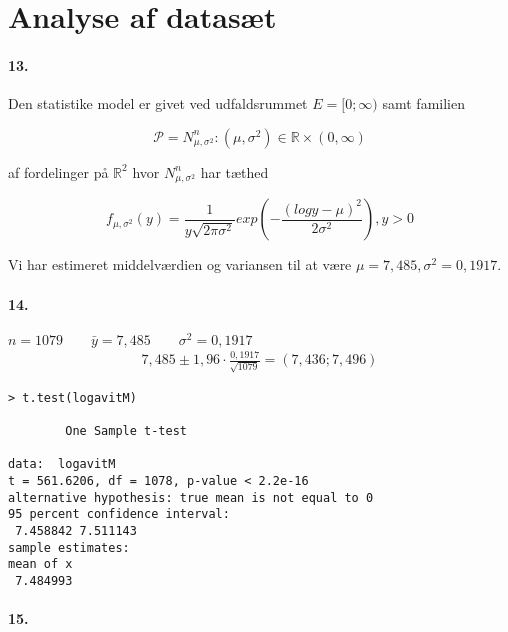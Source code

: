 \section{Analyse af datasæt}

\paragraph{13.}
Den statistike model er givet ved udfaldsrummet $E=[0; \infty)$ samt
familien

\begin{equation*}
  \mathcal{P} = N^n_{\mu,\sigma^2} : (\mu, \sigma^2) \in \mathbb{R}
  \times (0, \infty)
\end{equation*}

af fordelinger på $\mathbb{R}^2$ hvor $N^n_{\mu, \sigma^2}$ har tæthed

\begin{equation*}
  f_{\mu, \sigma^2}(y) = \frac{1}{y \sqrt{2\pi\sigma^2}} exp ( -
  \frac{(log y - \mu)^2}{2\sigma^2} ), y>0
\end{equation*}

Vi har estimeret middelværdien og variansen til at være $\mu = 7,485 ,
\sigma^2 = 0,1917$.


\paragraph{14.} %
$n = 1079 \qquad \bar{y} = 7,485 \qquad \sigma^2 = 0,1917$
\begin{align*}
7,485 \pm 1,96 \cdot \frac{0,1917}{\sqrt{1079}} = (7,436 ; 7,496)
\end{align*}

\begin{verbatim}
> t.test(logavitM)

        One Sample t-test

data:  logavitM 
t = 561.6206, df = 1078, p-value < 2.2e-16
alternative hypothesis: true mean is not equal to 0 
95 percent confidence interval:
 7.458842 7.511143 
sample estimates:
mean of x 
 7.484993 
\end{verbatim}

\paragraph{15.}
